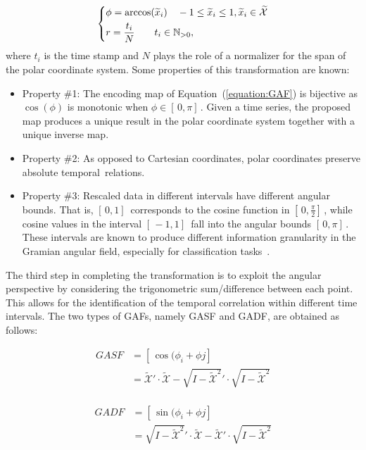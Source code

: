 \begin{equation}
\begin{dcases}
  \phi = \arccos(\widetilde{x}_{i}) \quad -1 \leq \widetilde{x}_{i} \leq 1, \widetilde{x}_{i} \in \widetilde{\mathcal{X}} \\
  r = \frac{t_{i}}{N} \quad \quad t_{i} \in \mathbb{N}_{>0},
\end{dcases}
\label{equation:GAF}
\end{equation} 
where $t_{i}$ is the time stamp and $N$ plays the role of a normalizer for the span of the polar coordinate system. Some properties of this transformation are known:

\begin{itemize}[leftmargin=*,labelsep=5.8mm]
\item {Property \#1}: The encoding map of Equation~(\ref{equation:GAF}) is bijective as $\cos(\phi)$ is monotonic when $\phi \in [\,0,\pi]\,$. Given a time series, the proposed map produces a unique result in the polar coordinate system together with a unique inverse map. 
\item {Property \#2}: As opposed to Cartesian coordinates, polar coordinates preserve absolute temporal~relations.
\item {Property \#3}: Rescaled data in different intervals have different angular bounds. That is, $[\,0,1]\,$ corresponds to the cosine function in $[\,0,\frac{\pi}{2}]\,$, while cosine values in the interval $[\,-1,1]\,$ fall into the angular bounds $[\,0,\pi]\,$. These intervals are known to produce different information granularity in the Gramian angular field, especially for classification tasks~\cite{wang_imaging_2015}.
\end{itemize}

The third step in completing the transformation is to exploit the angular perspective by considering the trigonometric sum/difference between each point. This allows for the identification of the temporal correlation within different time intervals. The two types of GAFs, namely GASF and GADF, are obtained as follows:

\begin{equation}
\begin{aligned}
GASF &= [\,\cos(\phi_{i} + \phi{j}]\, \\
	 &= \widetilde{\mathcal{X}}' \cdot \widetilde{\mathcal{X}} - \sqrt{I-\widetilde{\mathcal{X}}^2}' \cdot \sqrt{I-\widetilde{\mathcal{X}}^2}
\end{aligned}
\end{equation}
\\
\begin{equation}
\begin{aligned}
GADF &= [\,\sin(\phi_{i} + \phi{j}]\, \\
	 &= \sqrt{I-\widetilde{\mathcal{X}}^2}' \cdot \widetilde{\mathcal{X}} - \widetilde{\mathcal{X}}' \cdot \sqrt{I-\widetilde{\mathcal{X}}^2}\\
\end{aligned}
\end{equation}

